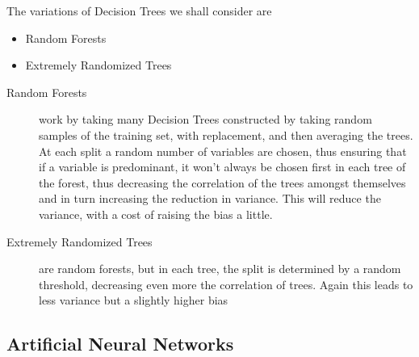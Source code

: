 The variations of Decision Trees we shall consider are
\begin{itemize}
\item Random Forests
\item Extremely Randomized Trees
\end{itemize}

\begin{description}
\item [Random Forests] work by taking many Decision Trees constructed by taking random samples of the training set, with replacement, and then averaging the trees. At each split a random number of variables are chosen, thus ensuring that if a variable is predominant, it won't always be chosen first in each tree of the forest, thus decreasing the correlation of the trees amongst themselves and in turn increasing the reduction in variance.
This will reduce the variance, with a cost of raising the bias a little.

\item [Extremely Randomized Trees] are random forests, but in each tree, the split is determined by a random threshold, decreasing even more the correlation of trees. 
Again this leads to less variance but a slightly higher bias
\end{description}


\subsection{Artificial Neural Networks}